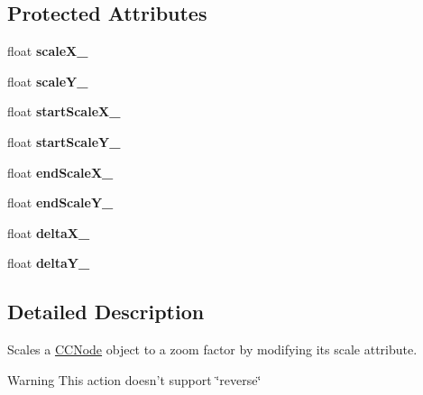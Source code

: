 \subsection*{Protected Attributes}
\begin{DoxyCompactItemize}
\item 
\hypertarget{interface_c_c_scale_to_a6af50d1c761736ee99d93f4b179c37c0}{float {\bfseries scale\-X\-\_\-}}\label{interface_c_c_scale_to_a6af50d1c761736ee99d93f4b179c37c0}

\item 
\hypertarget{interface_c_c_scale_to_ac29214e36f1b0363c439dc9dfc73526d}{float {\bfseries scale\-Y\-\_\-}}\label{interface_c_c_scale_to_ac29214e36f1b0363c439dc9dfc73526d}

\item 
\hypertarget{interface_c_c_scale_to_a199441ce850f57e19b351412ffaee7c6}{float {\bfseries start\-Scale\-X\-\_\-}}\label{interface_c_c_scale_to_a199441ce850f57e19b351412ffaee7c6}

\item 
\hypertarget{interface_c_c_scale_to_acde721ee77e14190e3cb181dad8984f6}{float {\bfseries start\-Scale\-Y\-\_\-}}\label{interface_c_c_scale_to_acde721ee77e14190e3cb181dad8984f6}

\item 
\hypertarget{interface_c_c_scale_to_abdde49682a8790d074b70ab80b26d80e}{float {\bfseries end\-Scale\-X\-\_\-}}\label{interface_c_c_scale_to_abdde49682a8790d074b70ab80b26d80e}

\item 
\hypertarget{interface_c_c_scale_to_a653ac1e9dc971c8e0e86a98e077f4e14}{float {\bfseries end\-Scale\-Y\-\_\-}}\label{interface_c_c_scale_to_a653ac1e9dc971c8e0e86a98e077f4e14}

\item 
\hypertarget{interface_c_c_scale_to_ab774b8d0c76954de82545024ec5c76db}{float {\bfseries delta\-X\-\_\-}}\label{interface_c_c_scale_to_ab774b8d0c76954de82545024ec5c76db}

\item 
\hypertarget{interface_c_c_scale_to_a90da12afdad1e84699814cf2cd3ae592}{float {\bfseries delta\-Y\-\_\-}}\label{interface_c_c_scale_to_a90da12afdad1e84699814cf2cd3ae592}

\end{DoxyCompactItemize}


\subsection{Detailed Description}
Scales a \hyperlink{class_c_c_node}{C\-C\-Node} object to a zoom factor by modifying its scale attribute. \begin{DoxyWarning}{Warning}
This action doesn't support \char`\"{}reverse\char`\"{} 
\end{DoxyWarning}


